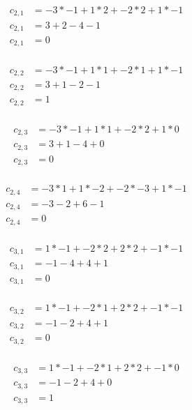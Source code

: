 \documentclass[12pt]{article}
\begin{document}
\begin{itemize}
\begin{align*}
    c_{2,1} &= -3 * -1 + 1 * 2 + -2 * 2 + 1 * -1 \\
    c_{2,1} &= 3 + 2 - 4 - 1 \\
    c_{2,1} &= 0 \\
\end{align*}

\begin{align*}
    c_{2,2} &= -3 * -1 + 1 * 1 + -2 * 1 + 1 * -1 \\
    c_{2,2} &= 3 + 1 - 2 - 1 \\
    c_{2,2} &= 1 \\
\end{align*}

\begin{align*}
    c_{2,3} &= -3 * -1 + 1 * 1 + -2 * 2 + 1 * 0 \\
    c_{2,3} &= 3 + 1 - 4 + 0 \\
    c_{2,3} &= 0 \\
\end{align*}

\begin{align*}
    c_{2,4} &= -3 * 1 + 1 * -2 + -2 * -3 + 1 * -1 \\
    c_{2,4} &= -3 - 2 + 6 - 1 \\
    c_{2,4} &= 0 \\
\end{align*}

\begin{align*}
    c_{3,1} &= 1 * -1 + -2 * 2 + 2 * 2 + -1 * -1 \\
    c_{3,1} &= -1 - 4 + 4 + 1 \\
    c_{3,1} &= 0  \\
\end{align*}

\begin{align*}
    c_{3,2} &= 1 * -1 + -2 * 1 + 2 * 2 + -1 * -1 \\
    c_{3,2} &= -1 - 2 + 4 + 1 \\
    c_{3,2} &= 0  \\
\end{align*}

\begin{align*}
    c_{3,3} &= 1 * -1 + -2 * 1 + 2 * 2 + -1 * 0 \\
    c_{3,3} &= -1 - 2 + 4 + 0 \\
    c_{3,3} &= 1  \\
\end{align*}


\end{itemize}
\end{document}
